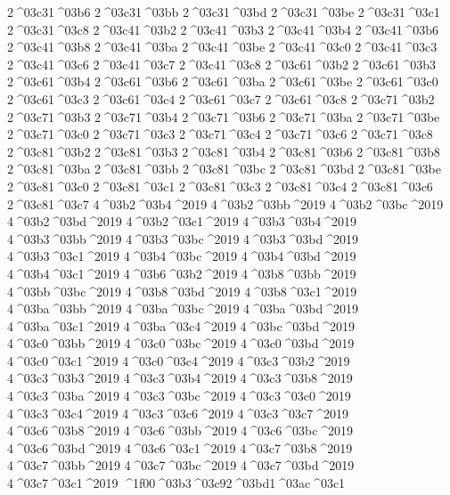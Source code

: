 {2^^^^03c31^^^^03b6
2^^^^03c31^^^^03bb
2^^^^03c31^^^^03bd
2^^^^03c31^^^^03be
2^^^^03c31^^^^03c1
2^^^^03c31^^^^03c8
%
2^^^^03c41^^^^03b2
2^^^^03c41^^^^03b3
2^^^^03c41^^^^03b4
2^^^^03c41^^^^03b6
2^^^^03c41^^^^03b8
2^^^^03c41^^^^03ba
2^^^^03c41^^^^03be
2^^^^03c41^^^^03c0
2^^^^03c41^^^^03c3
2^^^^03c41^^^^03c6
2^^^^03c41^^^^03c7
2^^^^03c41^^^^03c8
%
2^^^^03c61^^^^03b2
2^^^^03c61^^^^03b3
2^^^^03c61^^^^03b4
2^^^^03c61^^^^03b6
2^^^^03c61^^^^03ba
2^^^^03c61^^^^03be
2^^^^03c61^^^^03c0
2^^^^03c61^^^^03c3
2^^^^03c61^^^^03c4
2^^^^03c61^^^^03c7
2^^^^03c61^^^^03c8
%
2^^^^03c71^^^^03b2
2^^^^03c71^^^^03b3
2^^^^03c71^^^^03b4
2^^^^03c71^^^^03b6
2^^^^03c71^^^^03ba
2^^^^03c71^^^^03be
2^^^^03c71^^^^03c0
2^^^^03c71^^^^03c3
2^^^^03c71^^^^03c4
2^^^^03c71^^^^03c6
2^^^^03c71^^^^03c8
%
2^^^^03c81^^^^03b2
2^^^^03c81^^^^03b3
2^^^^03c81^^^^03b4
2^^^^03c81^^^^03b6
2^^^^03c81^^^^03b8
2^^^^03c81^^^^03ba
2^^^^03c81^^^^03bb
2^^^^03c81^^^^03bc
2^^^^03c81^^^^03bd
2^^^^03c81^^^^03be
2^^^^03c81^^^^03c0
2^^^^03c81^^^^03c1
2^^^^03c81^^^^03c3
2^^^^03c81^^^^03c4
2^^^^03c81^^^^03c6
2^^^^03c81^^^^03c7
4^^^^03b2^^^^03b4^^^^2019
4^^^^03b2^^^^03bb^^^^2019
4^^^^03b2^^^^03bc^^^^2019
4^^^^03b2^^^^03bd^^^^2019
4^^^^03b2^^^^03c1^^^^2019
%
4^^^^03b3^^^^03b4^^^^2019
4^^^^03b3^^^^03bb^^^^2019
4^^^^03b3^^^^03bc^^^^2019
4^^^^03b3^^^^03bd^^^^2019
4^^^^03b3^^^^03c1^^^^2019
%
4^^^^03b4^^^^03bc^^^^2019
4^^^^03b4^^^^03bd^^^^2019
4^^^^03b4^^^^03c1^^^^2019
%
4^^^^03b6^^^^03b2^^^^2019
%
4^^^^03b8^^^^03bb^^^^2019
4^^^^03bb^^^^03bc^^^^2019
4^^^^03b8^^^^03bd^^^^2019
4^^^^03b8^^^^03c1^^^^2019
%
4^^^^03ba^^^^03bb^^^^2019
4^^^^03ba^^^^03bc^^^^2019
4^^^^03ba^^^^03bd^^^^2019
4^^^^03ba^^^^03c1^^^^2019
4^^^^03ba^^^^03c4^^^^2019
%
4^^^^03bc^^^^03bd^^^^2019
%
4^^^^03c0^^^^03bb^^^^2019
4^^^^03c0^^^^03bc^^^^2019
4^^^^03c0^^^^03bd^^^^2019
4^^^^03c0^^^^03c1^^^^2019
4^^^^03c0^^^^03c4^^^^2019
%
4^^^^03c3^^^^03b2^^^^2019
4^^^^03c3^^^^03b3^^^^2019
4^^^^03c3^^^^03b4^^^^2019
4^^^^03c3^^^^03b8^^^^2019
4^^^^03c3^^^^03ba^^^^2019
4^^^^03c3^^^^03bc^^^^2019
4^^^^03c3^^^^03c0^^^^2019
4^^^^03c3^^^^03c4^^^^2019
4^^^^03c3^^^^03c6^^^^2019
4^^^^03c3^^^^03c7^^^^2019
%
4^^^^03c6^^^^03b8^^^^2019
4^^^^03c6^^^^03bb^^^^2019
4^^^^03c6^^^^03bc^^^^2019
4^^^^03c6^^^^03bd^^^^2019
4^^^^03c6^^^^03c1^^^^2019
%
4^^^^03c7^^^^03b8^^^^2019
4^^^^03c7^^^^03bb^^^^2019
4^^^^03c7^^^^03bc^^^^2019
4^^^^03c7^^^^03bd^^^^2019
4^^^^03c7^^^^03c1^^^^2019
%
^^^^1f00^^^^03b3^^^^03c92^^^^03bd1^^^^03ac^^^^03c1  %
}
